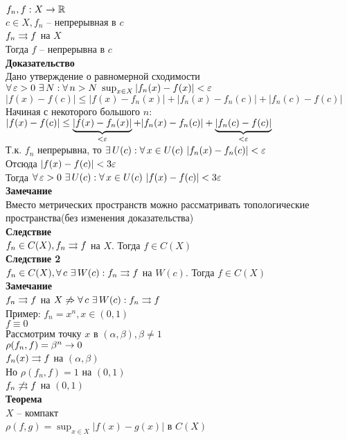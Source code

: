 \documentclass[12pt]{article}
\begin{document}
$f_n, f: X \rto \Rset$\\
$c \in X, f_n$ -- непрерывная в $c$\\
$f_n \rrto f$ на $X$\\
Тогда $f$ -- непрерывна в $c$\\
\textbf{Доказательство}\\
Дано утверждение о равномерной сходимости\\
$\fall \eps > 0\ \ex N: \fall n > N\ \sup_{x\in X} |f_n(x) - f(x)|<\eps$\\
$|f(x)-f(c)| \leq |f(x)-f_n(x)| + |f_n(x)-f_n(c)| + |f_n(c)-f(c)|$\\
Начиная с некоторого большого $n:$\\
$|f(x)-f(c)| \leq \ub{< \eps}{|f(x)-f_n(x)|} + |f_n(x)-f_n(c)| + \ub{< \eps}{|f_n(c)-f(c)|}$\\
Т.к. $f_n$ непрерывна, то $\ex U(c): \fall x \in U(c)\ |f_n(x)-f_n(c)| < \eps$\\
Отсюда $|f(x)-f(c)| < 3\eps$\\
Тогда $\fall \eps > 0\ \ex U(c): \fall x \in U(c)\ |f(x)-f(c)| < 3\eps$\\
\textbf{Замечание}\\
Вместо метрических пространств можно рассматривать топологические пространства(без изменения доказательства)\\
\textbf{Следствие}\\
$f_n \in C(X), f_n \rrto f$ на $X$. Тогда $f \in C(X)$\\
\textbf{Следствие 2}\\
$f_n \in C(X), \fall c\ \ex W(c): f_n \rrto f$ на $W(c)$. Тогда $f \in C(X)$\\
\textbf{Замечание}\\
$f_n \rrto f$ на $X \not \Rto \fall c\ \ex W(c): f_n \rrto f$\\
Пример: $f_n = x^n, x \in (0,1)$\\
$f \equiv 0$\\
Рассмотрим точку $x$ в $(\alpha, \beta), \beta \neq 1$\\
$\rho(f_n, f) = \beta^n \rto 0$\\
$f_n(x) \rrto f$ на $(\alpha, \beta)$\\
Но $\rho(f_n, f) = 1$ на $(0,1)$\\
$f_n \not\rrto f$ на $(0,1)$\\
\textbf{Теорема}\\
$X$ -- компакт\\
$\rho(f,g) = \sup_{x\in X}|f(x)-g(x)|$ в $C(X)$\\
\end{document}

